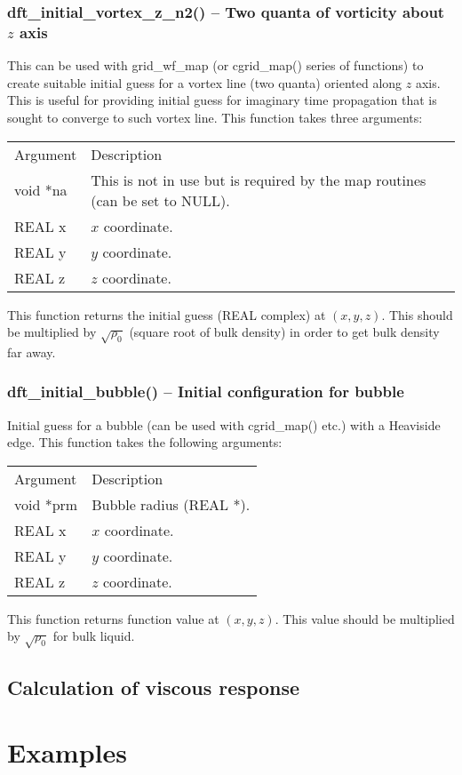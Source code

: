 \documentclass[12pt,letterpaper]{report}
\begin{document}
\subsection{dft\_initial\_vortex\_z\_n2() -- Two quanta of vorticity about $z$ axis}

This can be used with grid\_wf\_map (or cgrid\_map() series of functions) to create suitable initial guess for a vortex line (two quanta) oriented along $z$ axis. This is useful for providing initial guess for imaginary time propagation that is sought to converge to such vortex line. This function takes three arguments:
\begin{longtable}{p{} p{}}
Argument & Description\\
\cline{1-2}
void *na & This is not in use but is required by the map routines (can be set to NULL).\\
REAL x & $x$ coordinate.\\
REAL y & $y$ coordinate.\\
REAL z & $z$ coordinate.\\
\end{longtable}
\noindent
This function returns the initial guess (REAL complex) at $(x, y, z)$. This should be multiplied by $\sqrt{\rho_0}$ (square root of bulk density) in order to get bulk density far away. 

\subsection{dft\_initial\_bubble() -- Initial configuration for bubble}

Initial guess for a bubble (can be used with cgrid\_map() etc.) with a Heaviside edge. This function takes the following arguments:
\begin{longtable}{p{} p{}}
Argument & Description\\
\cline{1-2}
void *prm & Bubble radius (REAL *).\\
REAL x & $x$ coordinate.\\
REAL y & $y$ coordinate.\\
REAL z & $z$ coordinate.\\
\end{longtable}
\noindent
This function returns function value at $(x, y, z)$. This value should be multiplied by $\sqrt{\rho_0}$ for bulk liquid.

\section{Calculation of viscous response}

\chapter{Examples}
\end{document}
